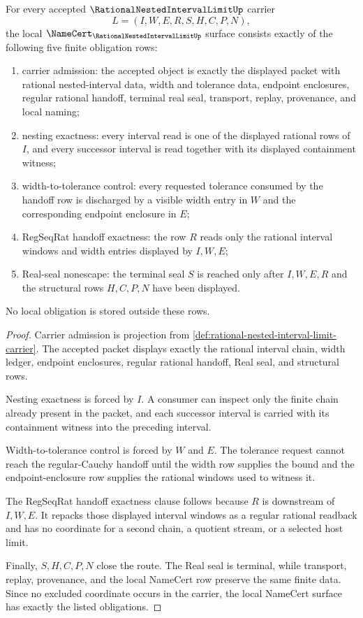 \begin{theorem}
\label{thm:rational-nested-interval-limit-namecert-obligations}
For every accepted $\RationalNestedIntervalLimitUp$ carrier
$$
L=(I,W,E,R,S,H,C,P,N),
$$
the local $\NameCert_{\RationalNestedIntervalLimitUp}$ surface consists exactly of the following five finite obligation rows:
\begin{enumerate}
\item carrier admission: the accepted object is exactly the displayed packet with rational nested-interval data, width and tolerance data, endpoint enclosures, regular rational handoff, terminal real seal, transport, replay, provenance, and local naming;
\item nesting exactness: every interval read is one of the displayed rational rows of $I$, and every successor interval is read together with its displayed containment witness;
\item width-to-tolerance control: every requested tolerance consumed by the handoff row is discharged by a visible width entry in $W$ and the corresponding endpoint enclosure in $E$;
\item RegSeqRat handoff exactness: the row $R$ reads only the rational interval windows and width entries displayed by $I,W,E$;
\item Real-seal nonescape: the terminal seal $S$ is reached only after $I,W,E,R$ and the structural rows $H,C,P,N$ have been displayed.
\end{enumerate}
No local obligation is stored outside these rows.
\end{theorem}
\begin{proof}
Carrier admission is projection from \autoref{def:rational-nested-interval-limit-carrier}. The accepted packet displays exactly the rational interval chain, width ledger, endpoint enclosures, regular rational handoff, Real seal, and structural rows.

Nesting exactness is forced by $I$. A consumer can inspect only the finite chain already present in the packet, and each successor interval is carried with its containment witness into the preceding interval.

Width-to-tolerance control is forced by $W$ and $E$. The tolerance request cannot reach the regular-Cauchy handoff until the width row supplies the bound and the endpoint-enclosure row supplies the rational windows used to witness it.

The RegSeqRat handoff exactness clause follows because $R$ is downstream of $I,W,E$. It repacks those displayed interval windows as a regular rational readback and has no coordinate for a second chain, a quotient stream, or a selected host limit.

Finally, $S,H,C,P,N$ close the route. The Real seal is terminal, while transport, replay, provenance, and the local NameCert row preserve the same finite data. Since no excluded coordinate occurs in the carrier, the local NameCert surface has exactly the listed obligations.
\end{proof}


